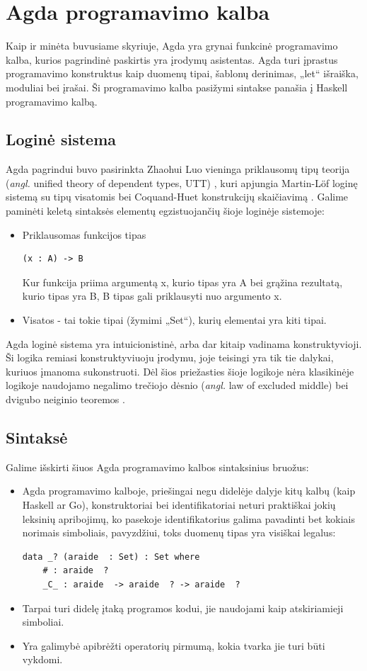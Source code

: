 \documentclass{VUMIFPSkursinis}
\begin{document}
\section{Agda programavimo kalba}
Kaip ir minėta buvusiame skyriuje, Agda yra grynai funkcinė programavimo kalba, kurios pagrindinė paskirtis yra įrodymų asistentas. Agda turi įprastus programavimo konstruktus kaip duomenų tipai, šablonų derinimas, „let“ išraiška, moduliai bei įrašai. Ši programavimo kalba pasižymi sintakse panašia į Haskell programavimo kalbą.
\subsection{Loginė sistema}
Agda pagrindui buvo pasirinkta Zhaohui Luo vieninga priklausomų tipų teorija (\textit{angl.} unified theory of dependent types, UTT) \cite{agdaInitial}, kuri apjungia Martin-Löf loginę sistemą su tipų visatomis bei Coquand-Huet konstrukcijų skaičiavimą \cite{schematicApproach}. Galime paminėti keletą sintaksės elementų egzistuojančių šioje loginėje sistemoje:
\begin{itemize}
	\item{ Priklausomas funkcijos tipas
		\begin{lstlisting}
(x : A) -> B
		\end{lstlisting}
		Kur funkcija priima argumentą x, kurio tipas yra A bei grąžina rezultatą, kurio tipas yra B, B tipas gali priklausyti nuo argumento x.
	}
	\item Visatos - tai tokie tipai (žymimi „Set“), kurių elementai yra kiti tipai.
\end{itemize}
Agda loginė sistema yra intuicionistinė, arba dar kitaip vadinama konstruktyvioji. Ši logika remiasi konstruktyviuoju įrodymu, joje teisingi yra tik tie dalykai, kuriuos įmanoma sukonstruoti. Dėl šios priežasties šioje logikoje nėra klasikinėje logikoje naudojamo negalimo trečiojo dėsnio (\textit{angl.} law of excluded middle) bei dvigubo neiginio teoremos \cite{intuitionistic}.
\subsection{Sintaksė}
Galime išskirti šiuos Agda programavimo kalbos sintaksinius bruožus:
\begin{itemize}
	\item {Agda programavimo kalboje, priešingai negu didelėje dalyje kitų kalbų (kaip Haskell ar Go), konstruktoriai bei identifikatoriai neturi praktiškai jokių leksinių apribojimų, ko pasekoje identifikatorius galima pavadinti bet kokiais norimais simboliais, pavyzdžiui, toks duomenų tipas yra visiškai legalus:
	\begin{lstlisting}
data _? (araide  : Set) : Set where
	# : araide  ?
	_C_ : araide  -> araide  ? -> araide  ?
	\end{lstlisting}
	}
	\item Tarpai turi didelę įtaką programos kodui, jie naudojami kaip atskiriamieji simboliai.
	\item Yra galimybė apibrėžti operatorių pirmumą, kokia tvarka jie turi būti vykdomi.
\end{itemize}
\end{document}

